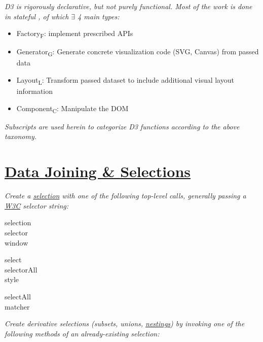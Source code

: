 \textit{D3 is rigorously declarative, but not purely functional. Most of the work is done in stateful , of which $\exists$ 4 main types:}\begin{itemize}
    \item Factory\textsubscript{F}: implement prescribed APIs
    \item Generator\textsubscript{G}: Generate concrete visualization code (SVG, Canvas) from passed data
    \item Layout\textsubscript{L}: Transform passed dataset to include additional visual layout information
    \item Component\textsubscript{C}: Manipulate the DOM
\end{itemize}\textit{Subscripts are used herein to categorize D3 functions according to the above taxonomy.}

\section{\href{https://github.com/d3/d3-selection}{Data Joining \& Selections}}

\textit{Create a \href{https://bost.ocks.org/mike/selection/}{selection} with one of the following top-level calls, generally passing a \href{http://www.w3.org/TR/selectors-api/}{W3C} selector string:}

{\footnotesize 
\begin{minipage}[t]{2.0cm}
    selection\\
    selector\\
    window
\end{minipage}
\begin{minipage}[t]{2.0cm}
    select\\
    selectorAll\\
    style
\end{minipage}
\begin{minipage}[t]{2.0cm}
    selectAll\\
    matcher\\
\end{minipage}
}



\textit{Create derivative selections (subsets, unions, \href{https://bost.ocks.org/mike/nest/}{nestings}) by invoking one of the following methods of an already-existing selection:}

